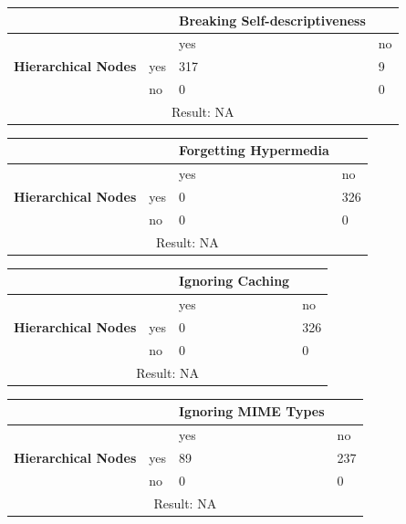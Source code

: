 \documentclass[a4paper,12pt]{article}
\begin{document}
\begin{center}
  \begin{tabular}{| p{60mm} | p{10mm} | p{35mm} | p{35mm} |}
  \hline
   & & \textbf{Breaking Self-descriptiveness} &
  \\
  \hline
  & & yes & no
  \\
  \hline
  \textbf{Hierarchical Nodes} & yes & 317 & 9
  \\
  \hline
   & no & 0 & 0
  \\
  \hline
  \multicolumn{4}{|c|}{Result: NA}
  \\ \hline
  \end{tabular}
  \end{center}

\begin{center}
  \begin{tabular}{| p{60mm} | p{10mm} | p{35mm} | p{35mm} |}
  \hline
   & & \textbf{Forgetting Hypermedia} &
  \\
  \hline
  & & yes & no
  \\
  \hline
  \textbf{Hierarchical Nodes} & yes & 0 & 326
  \\
  \hline
   & no & 0 & 0
  \\
  \hline
  \multicolumn{4}{|c|}{Result: NA}
  \\ \hline
  \end{tabular}
  \end{center}

\begin{center}
  \begin{tabular}{| p{60mm} | p{10mm} | p{35mm} | p{35mm} |}
  \hline
   & & \textbf{Ignoring Caching} &
  \\
  \hline
  & & yes & no
  \\
  \hline
  \textbf{Hierarchical Nodes} & yes & 0 & 326
  \\
  \hline
   & no & 0 & 0
  \\
  \hline
  \multicolumn{4}{|c|}{Result: NA}
  \\ \hline
  \end{tabular}
  \end{center}

\begin{center}
  \begin{tabular}{| p{60mm} | p{10mm} | p{35mm} | p{35mm} |}
  \hline
   & & \textbf{Ignoring MIME Types} &
  \\
  \hline
  & & yes & no
  \\
  \hline
  \textbf{Hierarchical Nodes} & yes & 89 & 237
  \\
  \hline
   & no & 0 & 0
  \\
  \hline
  \multicolumn{4}{|c|}{Result: NA}
  \\ \hline
  \end{tabular}
  \end{center}
\end{document}
